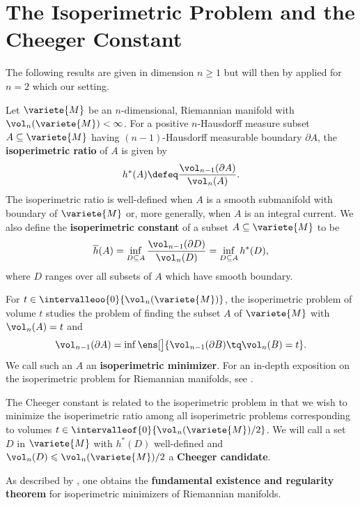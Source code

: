 
\section{The Isoperimetric Problem and the Cheeger Constant \texorpdfstring{{\cite[Sec. 3]{benson_cheeger_2016}}}{[Ben16, Sec. 3]}}

\begin{remarque}
    The following results are given in dimension $n \geqslant 1$ but will then by applied for $n = 2$ which our setting. 
\end{remarque}

Let $\variete{M}$ be an $n$-dimensional, Riemannian manifold with $\vol_n(\variete{M}) < \infty$. For a positive $n$-Hausdorff measure subset $A \subseteq \variete{M}$ having $(n-1)$-Hausdorff measurable boundary $\partial A$, the \textbf{isoperimetric ratio} of $A$ is given by
\begin{equation}
    h^\ast(A) \defeq \frac{\vol_{n-1}(\partial A)}{\vol_n(A)}.
\end{equation}
The isoperimetric ratio is well-defined when $A$ is a smooth submanifold with boundary of $\variete{M}$ or, more generally, when $A$ is an integral current. We also define the \textbf{isoperimetric constant} of a subset $A \subseteq \variete{M}$ to be 
\begin{equation}
\overline{h}(A) = \inf_{D \subseteq A} \frac{\vol_{n-1}(\partial D)}{\vol_n(D)} = \inf_{D \subseteq A} h^\ast(D),
\end{equation}
where $D$ ranges over all subsets of $A$ which have smooth boundary. 

For $t \in \intervalleoo{0}{\vol_n(\variete{M})}$, the isoperimetric problem of volume $t$ studies the problem of finding the subset $A$ of $\variete{M}$ with $\vol_n(A) = t$ and
\[
\vol_{n-1}(\partial A) = \inf \ens[\big]{\vol_{n-1}(\partial B) \tq \vol_n(B) = t}.
\]
We call such an $A$ an \textbf{isoperimetric minimizer}. For an in-depth exposition on the isoperimetric problem for Riemannian manifolds, see \cite{ros_isoperimetric_2005}.

The Cheeger constant is related to the isoperimetric problem in that we wish to minimize the isoperimetric ratio among all isoperimetric problems corresponding to volumes $t \in \intervalleof{0}{\vol_n(\variete{M})/2}$. We will call a set $D$ in $\variete{M}$ with $h^\ast(D)$ well-defined and $\vol_n(D) \leqslant \vol_n(\variete{M})/2$ a \textbf{Cheeger candidate}.

As described by \cite{ros_isoperimetric_2005}, one obtains the \textbf{fundamental existence and regularity theorem} for isoperimetric minimizers of Riemannian manifolds.

